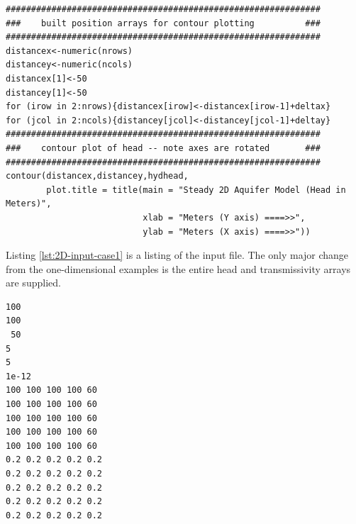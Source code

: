 \begin{lstlisting}[caption= R code demonstrating building a contour plot from the computed head distribution \\ , label=lst:2D-Contour]
##############################################################
###    built position arrays for contour plotting          ###
##############################################################
distancex<-numeric(nrows)
distancey<-numeric(ncols)
distancex[1]<-50
distancey[1]<-50
for (irow in 2:nrows){distancex[irow]<-distancex[irow-1]+deltax}
for (jcol in 2:ncols){distancey[jcol]<-distancey[jcol-1]+deltay}
##############################################################
###    contour plot of head -- note axes are rotated       ###
##############################################################
contour(distancex,distancey,hydhead,
        plot.title = title(main = "Steady 2D Aquifer Model (Head in Meters)",
                           xlab = "Meters (Y axis) ====>>", 
                           ylab = "Meters (X axis) ====>>"))
\end{lstlisting}

Listing \ref{lst:2D-input-case1} is a listing of the input file.  The only major change from the one-dimensional examples is the entire head and transmissivity arrays are supplied.  

\begin{lstlisting}[caption= Input File for Example Problem \\ , label=lst:2D-input-case1]
100
100
 50
5
5
1e-12
100 100 100 100 60
100 100 100 100 60
100 100 100 100 60
100 100 100 100 60
100 100 100 100 60
0.2 0.2 0.2 0.2 0.2
0.2 0.2 0.2 0.2 0.2
0.2 0.2 0.2 0.2 0.2
0.2 0.2 0.2 0.2 0.2
0.2 0.2 0.2 0.2 0.2
\end{lstlisting}

